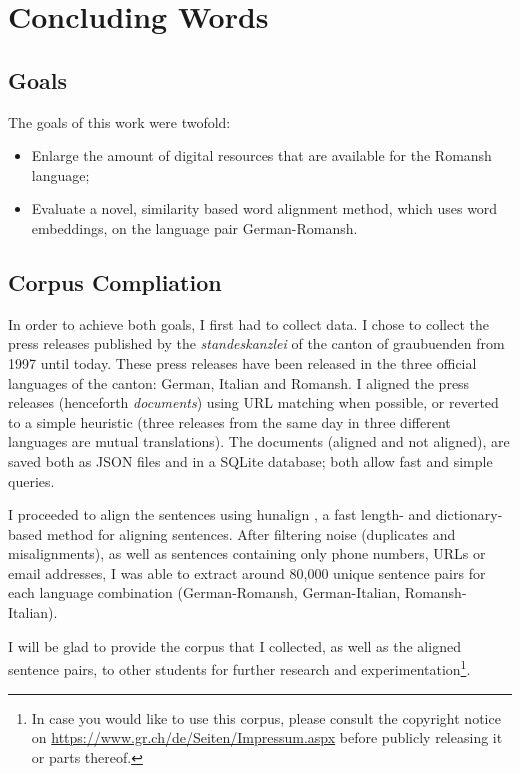 \chapter{Concluding Words}\label{chap:summary}

\section{Goals}
The goals of this work were twofold: 
\begin{itemize}
	\item Enlarge the amount of digital resources that are available for the Romansh language;
	\item Evaluate a novel, similarity based word alignment method, which uses word embeddings, on the language pair German-Romansh.
\end{itemize}


\section{Corpus Compliation}
In order to achieve both goals, I first had to collect data. 
I chose to collect the press releases published by the \emph{\Gls{standeskanzlei}} of the canton of \Gls{graubuenden} from 1997 until today. 
These press releases have been released in the three official languages of the canton: German, Italian and Romansh. 
I aligned the press releases (henceforth \emph{documents}) using URL matching when possible, or reverted to a simple heuristic (three releases from the same day in three different languages are mutual translations).
The documents (aligned and not aligned), are saved both as \acrshort{JSON} files and in a SQLite database; both allow  fast and simple queries.

I  proceeded to align the sentences using hunalign \autocite{hunalign}, a fast length- and dictionary-based method for aligning sentences. 
After filtering noise (duplicates and misalignments), as well as sentences containing only phone numbers, \acrshort{URL}s or email addresses, I was able to extract around 80,000 unique sentence pairs for each language combination (German-Romansh, German-Italian, Romansh-Italian).

I will be glad to provide  the corpus that I collected, as well as the aligned sentence pairs, to other students for further research and experimentation{\footnote{In case you would like to use this corpus, please consult the copyright notice on \url{https://www.gr.ch/de/Seiten/Impressum.aspx} before publicly releasing it or parts thereof.}}. 

